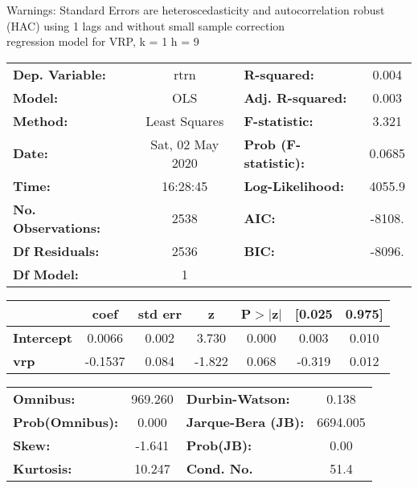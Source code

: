 Warnings: \newline
 [1] Standard Errors are heteroscedasticity and autocorrelation robust (HAC) using 1 lags and without small sample correction\\ 

regression model for VRP, k = 1 h = 9\begin{center}
\begin{tabular}{lclc}
\toprule
\textbf{Dep. Variable:}    &       rtrn       & \textbf{  R-squared:         } &     0.004   \\
\textbf{Model:}            &       OLS        & \textbf{  Adj. R-squared:    } &     0.003   \\
\textbf{Method:}           &  Least Squares   & \textbf{  F-statistic:       } &     3.321   \\
\textbf{Date:}             & Sat, 02 May 2020 & \textbf{  Prob (F-statistic):} &   0.0685    \\
\textbf{Time:}             &     16:28:45     & \textbf{  Log-Likelihood:    } &    4055.9   \\
\textbf{No. Observations:} &        2538      & \textbf{  AIC:               } &    -8108.   \\
\textbf{Df Residuals:}     &        2536      & \textbf{  BIC:               } &    -8096.   \\
\textbf{Df Model:}         &           1      & \textbf{                     } &             \\
\bottomrule
\end{tabular}
\begin{tabular}{lcccccc}
                   & \textbf{coef} & \textbf{std err} & \textbf{z} & \textbf{P$> |$z$|$} & \textbf{[0.025} & \textbf{0.975]}  \\
\midrule
\textbf{Intercept} &       0.0066  &        0.002     &     3.730  &         0.000        &        0.003    &        0.010     \\
\textbf{vrp}       &      -0.1537  &        0.084     &    -1.822  &         0.068        &       -0.319    &        0.012     \\
\bottomrule
\end{tabular}
\begin{tabular}{lclc}
\textbf{Omnibus:}       & 969.260 & \textbf{  Durbin-Watson:     } &    0.138  \\
\textbf{Prob(Omnibus):} &   0.000 & \textbf{  Jarque-Bera (JB):  } & 6694.005  \\
\textbf{Skew:}          &  -1.641 & \textbf{  Prob(JB):          } &     0.00  \\
\textbf{Kurtosis:}      &  10.247 & \textbf{  Cond. No.          } &     51.4  \\
\bottomrule
\end{tabular}
\end{center}

